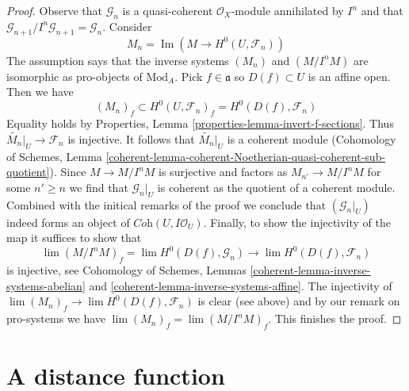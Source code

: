 \documentclass{stacks-project}
\theoremstyle{plain}
\theoremstyle{definition}
\theoremstyle{remark}
\numberwithin{equation}{subsection}
\def\lim{\mathop{\mathrm{lim}}\nolimits}
\def\Im{\mathop{\mathrm{Im}}}
\begin{document}
\begin{proof}
Observe that $\mathcal{G}_n$ is a quasi-coherent $\mathcal{O}_X$-module
annihilated by $I^n$ and that
$\mathcal{G}_{n + 1}/I^n\mathcal{G}_{n + 1} = \mathcal{G}_n$.
Consider
$$
M_n = \Im(M \longrightarrow H^0(U, \mathcal{F}_n))
$$
The assumption says that the inverse systems $(M_n)$ and
$(M/I^nM)$ are isomorphic as pro-objects of $\text{Mod}_A$.
Pick $f \in \mathfrak a$ so $D(f) \subset U$ is an affine open. Then we have
$$
(M_n)_f \subset H^0(U, \mathcal{F}_n)_f = H^0(D(f), \mathcal{F}_n)
$$
Equality holds by Properties, Lemma \ref{properties-lemma-invert-f-sections}.
Thus $\widetilde{M_n}|_U \to \mathcal{F}_n$ is injective.
It follows that $\widetilde{M_n}|_U$ is a coherent module
(Cohomology of Schemes, Lemma
\ref{coherent-lemma-coherent-Noetherian-quasi-coherent-sub-quotient}).
Since $M \to M/I^nM$ is surjective and factors as
$M_{n'} \to M/I^nM$ for some $n' \geq n$ we find that $\mathcal{G}_n|_U$
is coherent as the quotient of a coherent module.
Combined with the initical remarks of the proof we conclude
that $(\mathcal{G}_n|_U)$ indeed forms an object
of $\textit{Coh}(U, I\mathcal{O}_U)$.
Finally, to show the injectivity of the map
it suffices to show that
$$
\lim (M/I^nM)_f = \lim H^0(D(f), \mathcal{G}_n) \to
\lim H^0(D(f), \mathcal{F}_n)
$$
is injective, see Cohomology of Schemes, Lemmas
\ref{coherent-lemma-inverse-systems-abelian} and
\ref{coherent-lemma-inverse-systems-affine}.
The injectivity of $\lim (M_n)_f \to \lim H^0(D(f), \mathcal{F}_n)$
is clear (see above) and by our remark on pro-systems we have
$\lim (M_n)_f = \lim (M/I^nM)_f$. This finishes the proof.
\end{proof}





\section{A distance function}
\label{section-distance}
\end{document}
